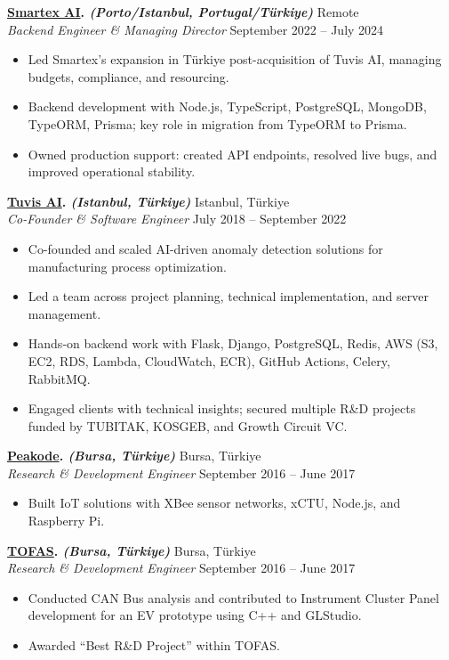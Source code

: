 \documentclass[10pt,a4paper]{extarticle}
\begin{document}
\textbf{\href{https://smartex.ai}{Smartex AI}. \textit{(Porto/Istanbul, Portugal/Türkiye)}} \hfill Remote\\
\textit{Backend Engineer \& Managing Director} \hfill September 2022 --  July 2024
\begin{itemize}[leftmargin=*,noitemsep,topsep=0pt]
    \item Led Smartex’s expansion in Türkiye post-acquisition of Tuvis AI, managing budgets, compliance, and resourcing.
    \item Backend development with Node.js, TypeScript, PostgreSQL, MongoDB, TypeORM, Prisma; key role in migration from TypeORM to Prisma.
    \item Owned production support: created API endpoints, resolved live bugs, and improved operational stability.
\end{itemize}


\textbf{\href{https://www.tuvisai.com}{Tuvis AI}. \textit{(Istanbul, Türkiye)}} \hfill Istanbul, Türkiye\\
\textit{Co-Founder \& Software Engineer} \hfill July 2018 -- September 2022
\begin{itemize}[leftmargin=*,noitemsep,topsep=0pt]
    \item Co-founded and scaled AI-driven anomaly detection solutions for manufacturing process optimization.
    \item Led a team across project planning, technical implementation, and server management.
    \item Hands-on backend work with Flask, Django, PostgreSQL, Redis, AWS (S3, EC2, RDS, Lambda, CloudWatch, ECR), GitHub Actions, Celery, RabbitMQ.
    \item Engaged clients with technical insights; secured multiple R\&D projects funded by TUBITAK, KOSGEB, and Growth Circuit VC.
\end{itemize}

\textbf{\href{https://www.peakode.com}{Peakode}. \textit{(Bursa, Türkiye)}} \hfill Bursa, Türkiye\\
\textit{Research \& Development Engineer} \hfill September 2016 -- June 2017
\begin{itemize}[leftmargin=*,noitemsep,topsep=0pt]
    \item Built IoT solutions with XBee sensor networks, xCTU, Node.js, and Raspberry Pi.
\end{itemize}

\textbf{\href{https://www.tofas.com.tr}{TOFAS}. \textit{(Bursa, Türkiye)}} \hfill Bursa, Türkiye\\
\textit{Research \& Development Engineer} \hfill September 2016 -- June 2017
\begin{itemize}[leftmargin=*,noitemsep,topsep=0pt]
    \item Conducted CAN Bus analysis and contributed to Instrument Cluster Panel development for an EV prototype using C++ and GLStudio.
    \item Awarded ``Best R\&D Project'' within TOFAS.
\end{itemize}
\end{document}
